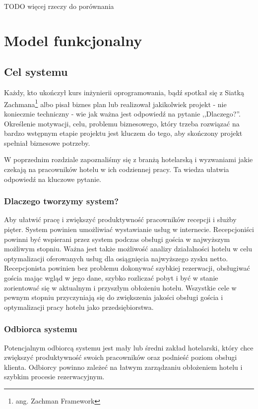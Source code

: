 \documentclass[a4paper,onecolumn,oneside,11pt,wide,floatssmall]{mwrep}
\theoremstyle{definition}
\theoremstyle{plain}%
\theoremstyle{remark}
\begin{document}
TODO więcej rzeczy do porównania

\chapter{Model funkcjonalny}
\label{wymagania}
\section{Cel systemu}
Każdy, kto ukończył kurs inżynierii oprogramowania, bądź spotkał się z Siatką Zachmana\footnote{ang. Zachman Framework}
 \cite{zachman1986framework} albo pisał biznes plan lub realizował jakikolwiek projekt - nie koniecznie techniczny -  
 wie jak ważna jest odpowiedź na pytanie ,,Dlaczego?''. Określenie motywacji, celu, problemu biznesowego, który trzeba 
 rozwiązać na bardzo wstępnym etapie projektu jest kluczem do tego, aby skończony projekt spełniał biznesowe potrzeby.

W poprzednim rozdziale zapoznaliśmy się z branżą hotelarską i wyzwaniami jakie czekają na pracowników hotelu w ich 
codziennej pracy. Ta wiedza ułatwia odpowiedź na kluczowe pytanie.

\subsection{Dlaczego tworzymy system?}
Aby ułatwić pracę i zwiększyć produktywność pracowników recepcji i służby pięter. System powinien 
umożliwiać wystawianie usług w internecie. Recepcjoniści powinni być wspierani przez system podczas obsługi gościa w 
najwyższym możliwym stopniu. Ważna jest także możliwość analizy działalności hotelu w celu optymalizacji oferowanych 
usług dla osiągnięcia najwyższego zysku netto. Recepcjonista powinien bez problemu dokonywać szybkiej rezerwacji, 
obsługiwać gościa mając wgląd w jego dane, szybko rozliczać pobyt i być w stanie zorientować się w aktualnym i 
przyszłym obłożeniu hotelu. Wszystkie cele w pewnym stopniu przyczyniają się do zwiększenia jakości obsługi gościa i 
optymalizacji pracy hotelu jako przedsiębiorstwa.

\subsection{Odbiorca systemu}
Potencjalnym odbiorcą systemu jest mały lub średni zakład hotelarski, który chce zwiększyć produktywność swoich pracowników oraz podnieść poziom obsługi klienta. Odbiorcy powinno zależeć na łatwym zarządzaniu obłożeniem hotelu i szybkim procesie rezerwacyjnym.
\end{document}
